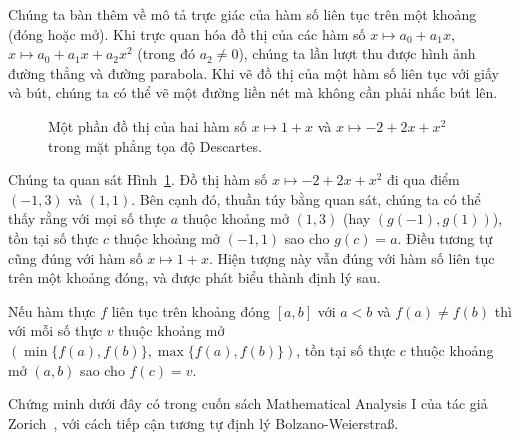 Chúng ta bàn thêm về mô tả trực giác của hàm số liên tục trên một khoảng (đóng hoặc mở). Khi trực quan hóa đồ thị của các hàm số $x\mapsto a_{0} + a_{1}x$, $x\mapsto a_{0} + a_{1}x + a_{2}x^{2}$ (trong đó $a_{2}\ne 0$), chúng ta lần lượt thu được hình ảnh đường thẳng và đường parabola. Khi vẽ đồ thị của một hàm số liên tục với giấy và bút, chúng ta có thể vẽ một đường liền nét mà không cần phải nhấc bút lên.
\begin{figure}[htp]
    \centering
    \caption{Một phần đồ thị của hai hàm số $x\mapsto 1+x$ và $x\mapsto -2+2x+x^{2}$ trong mặt phẳng tọa độ Descartes.}\label{fig:graph-of-linear-function-and-quadratic-function}
\end{figure}

Chúng ta quan sát Hình~\ref{fig:graph-of-linear-function-and-quadratic-function}. Đồ thị hàm số $x\mapsto -2 + 2x + x^{2}$ đi qua điểm $(-1, 3)$ và $(1, 1)$. Bên cạnh đó, thuần túy bằng quan sát, chúng ta có thể thấy rằng với mọi số thực $a$ thuộc khoảng mở $(1, 3)$ (hay $(g(-1), g(1))$), tồn tại số thực $c$ thuộc khoảng mở $(-1, 1)$ sao cho $g(c) = a$. Điều tương tự cũng đúng với hàm số $x\mapsto 1 + x$. Hiện tượng này vẫn đúng với hàm số liên tục trên một khoảng đóng, và được phát biểu thành định lý sau.

\begin{theorem}
    Nếu hàm thực $f$ liên tục trên khoảng đóng $[a, b]$ với $a < b$ và $f(a)\ne f(b)$ thì với mỗi số thực $v$ thuộc khoảng mở $( \min\{ f(a), f(b) \}, \max\{ f(a), f(b) \} )$, tồn tại số thực $c$ thuộc khoảng mở $(a, b)$ sao cho $f(c) = v$.
\end{theorem}

Chứng minh dưới đây có trong cuốn sách Mathematical Analysis I của tác giả Zorich~\cite{zorich}, với cách tiếp cận tương tự định lý Bolzano-Weierstra{\ss}.


